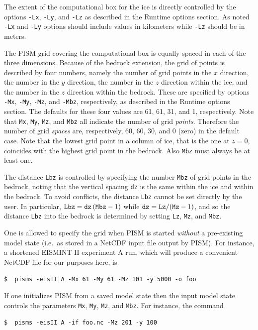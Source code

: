 \documentclass[11pt,final]{amsart}
\renewcommand{\t}[1]{\texttt{#1}}
\begin{document}
The extent of the computational box for the ice is directly controlled by the options \t{-Lx}, \t{-Ly}, and \t{-Lz} as described in the Runtime options section.  As noted \t{-Lx} and \t{-Ly} options should include values in kilometers while \t{-Lz} should be in meters.

The PISM grid covering the computational box is equally spaced in each of the three dimensions.  Because of the bedrock extension, the grid of points is described by four numbers, namely the number of grid points in the $x$ direction, the number in the $y$ direction, the number in the $z$ direction within the ice, and the number in the $z$ direction within the bedrock.  These are specified by options \verb|-Mx|, \verb|-My|, \verb|-Mz|, and \verb|-Mbz|, respectively, as described in the Runtime options section.  The defaults for these four values are 61, 61, 31, and 1, respectively.  Note that \verb|Mx|, \verb|My|, \verb|Mz|, and \verb|Mbz| all indicate the number of grid \emph{points}.  Therefore the number of grid \emph{spaces} are, respectively, 60, 60, 30, and 0 (zero) in the default case.  Note that the lowest grid point in a column of ice, that is the one at $z=0$, coincides with the highest grid point in the bedrock.  Also \verb|Mbz| must always be at least one.

The distance \t{Lbz} is controlled by specifying the number \verb|Mbz| of grid points in the bedrock, noting that the vertical spacing \t{dz} is the same within the ice and within the bedrock.  To avoid conflicts, the distance \t{Lbz} cannot be set directly by the user.  In particular, $\text{\t{Lbz}}=\text{\t{dz}}\,(\text{\t{Mbz}}-1)$ while $\text{\t{dz}} = \text{\t{Lz}} / (\text{\t{Mz}}-1)$, and so the distance \t{Lbz} into the bedrock is determined by setting \t{Lz}, \t{Mz}, and \t{Mbz}.

One is allowed to specify the grid when PISM is started \emph{without} a pre-existing model state (i.e.~as stored in a NetCDF input file output by PISM).  For instance, a shortened EISMINT II experiment A \cite{EISMINT00} run, which will produce a convenient NetCDF file for our purposes here, is

\verb|$  pisms -eisII A -Mx 61 -My 61 -Mz 101 -y 5000 -o foo|

\noindent If one initializes PISM from a saved model state then the input model state controls the parameters \t{Mx}, \t{My}, \t{Mz}, and \t{Mbz}.  For instance, the command

\verb|$  pisms -eisII A -if foo.nc -Mz 201 -y 100|
\end{document}
